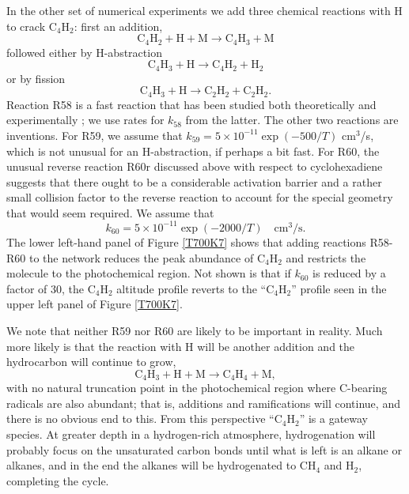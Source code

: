 \documentclass[preprint]{aastex}
\newcounter{reaction}
\begin{document}
In the other set of numerical experiments we add three chemical reactions with H to crack C$_4$H$_2$:
first an addition,
\begin{equation}\tag{R58}
  \mathrm{C}_4\mathrm{H}_2 + \mathrm{H} + \mathrm{M} \rightarrow \mathrm{C}_4\mathrm{H}_3  + \mathrm{M}
\end{equation} 
followed either by H-abstraction 
\begin{equation}\tag{R59}
  \mathrm{C}_4\mathrm{H}_3 + \mathrm{H}  \rightarrow \mathrm{C}_4\mathrm{H}_2  + \mathrm{H}_2
\end{equation} 
or by fission
\begin{equation}\tag{R60}
  \mathrm{C}_4\mathrm{H}_3 + \mathrm{H}  \rightarrow \mathrm{C}_2\mathrm{H}_2  + \mathrm{C}_2\mathrm{H}_2.
\end{equation} 
Reaction R58 is a fast reaction that has been studied both theoretically
and experimentally \citep{Eiteneer2003,Klippenstein2005}; we use rates for $k_{58}$ from the latter.
The other two reactions are inventions.
For R59, we assume that $k_{59}=5\times 10^{-11} \exp{\left(-500/T\right)}$ cm$^3$/s, which is not unusual for an H-abstraction,
if perhaps a bit fast.
For R60, the unusual reverse reaction R60r discussed above with respect to cyclohexadiene suggests that there ought to be a considerable
activation barrier and a rather small collision factor to the reverse reaction
to account for the special geometry that would seem required.
We assume that 
\begin{equation}\label{k60}
k_{60}=5\times 10^{-11} \exp{\left(-2000/T\right)} \quad \mathrm{cm}^3/\mathrm{s}.
\end{equation}
 The lower left-hand panel of Figure \ref{T700K7} shows that adding reactions R58-R60 to the network reduces
 the peak abundance of C$_4$H$_2$ and restricts the molecule to the photochemical region.
 Not shown is that if $k_{60}$ is reduced by a factor of 30, the 
 C$_4$H$_2$ altitude profile reverts to the ``C$_4$H$_2$'' profile seen in the upper left panel of Figure \ref{T700K7}.
 
We note that neither R59 nor R60 are likely to be important in reality.   
Much more likely is that the reaction with H will be another addition \citep{Harding2007} and the hydrocarbon will continue to grow,
\begin{equation}\tag{R61}
  \mathrm{C}_4\mathrm{H}_3 + \mathrm{H} + \mathrm{M}  \rightarrow \mathrm{C}_4\mathrm{H}_4  + \mathrm{M}, 
\end{equation}
with no natural truncation point in the photochemical region where C-bearing radicals are also abundant;
that is, additions and ramifications will continue, and there is no obvious end to this.
From this perspective ``C$_4$H$_2$'' is a gateway species. 
At greater depth in a hydrogen-rich atmosphere, hydrogenation will probably focus on the unsaturated carbon
bonds until what is left is an alkane or alkanes, and in the end the alkanes will be hydrogenated to CH$_4$ and H$_2$,
completing the cycle.
 
\end{document}
